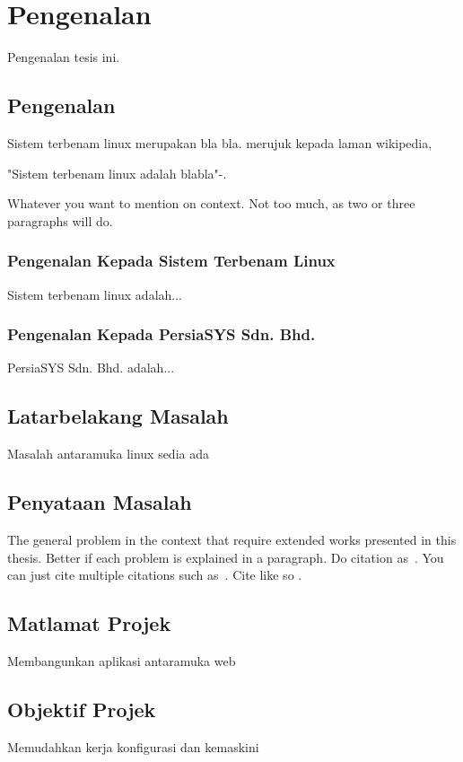 \chapter{Pengenalan}\label{c1}%
Pengenalan tesis ini.

\section{Pengenalan}
Sistem terbenam linux merupakan bla bla. merujuk kepada laman wikipedia,

"Sistem terbenam linux adalah blabla"-\cite{w2}.

Whatever you want to mention on context. Not too much, as two or
three paragraphs will do.

\subsection{Pengenalan Kepada Sistem Terbenam Linux}%
Sistem terbenam linux adalah...

\subsection{Pengenalan Kepada PersiaSYS Sdn. Bhd.}%
PersiaSYS Sdn. Bhd. adalah...

\section{Latarbelakang Masalah}
Masalah antaramuka linux sedia ada

\section{Penyataan Masalah}
The general problem in the context that require extended works
presented in this thesis. Better if each problem is explained in a
paragraph. Do citation as~\cite{b1}. You can just cite multiple
citations such as~\cite{j1, c1, w1}. Cite like so \cite{b1}.

\section{Matlamat Projek}
Membangunkan aplikasi antaramuka web

\section{Objektif Projek}
Memudahkan kerja konfigurasi dan kemaskini

